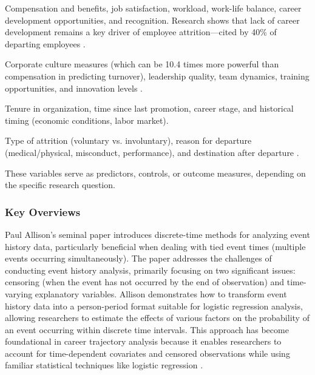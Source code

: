 \documentclass[../main.tex]{subfiles}
\begin{document}
Compensation and benefits, job satisfaction, workload, work-life balance, career development opportunities, and recognition. Research shows that lack of career development remains a key driver of employee attrition—cited by 40\% of departing employees \parencite{gartner2023career}.

Corporate culture measures (which can be 10.4 times more powerful than compensation in predicting turnover), leadership quality, team dynamics, training opportunities, and innovation levels \parencite{sull2022toxic}.

Tenure in organization, time since last promotion, career stage, and historical timing (economic conditions, labor market).

Type of attrition (voluntary vs. involuntary), reason for departure (medical/physical, misconduct, performance), and destination after departure \parencite{niessen2016attrition}.

These variables serve as predictors, controls, or outcome measures, depending on the specific research question.

\subsubsection{Key Overviews}

Paul Allison's seminal paper introduces discrete-time methods for analyzing event history data, particularly beneficial when dealing with tied event times (multiple events occurring simultaneously). The paper addresses the challenges of conducting event history analysis, primarily focusing on two significant issues: censoring (when the event has not occurred by the end of observation) and time-varying explanatory variables. Allison demonstrates how to transform event history data into a person-period format suitable for logistic regression analysis, allowing researchers to estimate the effects of various factors on the probability of an event occurring within discrete time intervals. This approach has become foundational in career trajectory analysis because it enables researchers to account for time-dependent covariates and censored observations while using familiar statistical techniques like logistic regression \parencite{allison1982discrete}.
\end{document}
